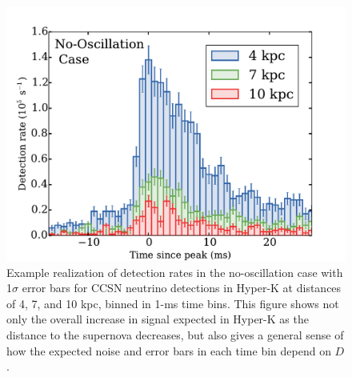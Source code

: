 \begin{figure}[h]
\centering
\includegraphics[width=0.7\linewidth]{hyperk_histograms.pdf}
\caption{\label{fig:hyperkhistogram}Example realization of detection
  rates in the no-oscillation case with
  1$\sigma$ error bars for CCSN neutrino detections in
  Hyper-K at distances of 4, 7, and 10 kpc, binned in 1-ms time bins.
  This figure shows not only the overall increase in signal expected
  in Hyper-K as the distance to the supernova decreases, but also gives a
  general sense of how the expected noise and error bars in each time bin
  depend on $D$.}
\end{figure}


